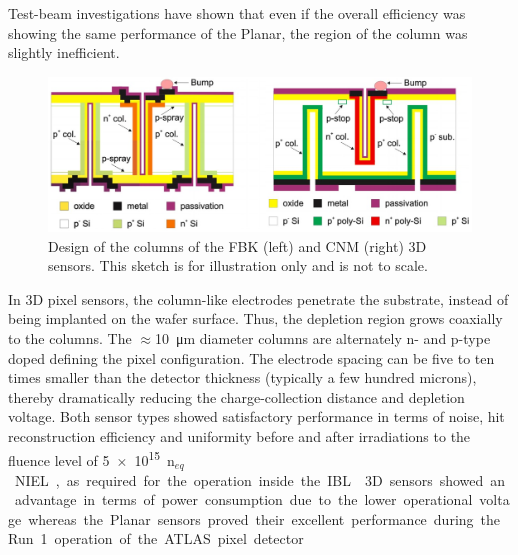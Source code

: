 Test-beam investigations have shown that even if the overall efficiency was showing the same performance of the Planar, the region of the column was slightly inefficient. \\
\begin{figure}
\centering
\includegraphics[width=\textwidth]{Images/ibl_paper/chapter04_Modules/3d_design.png}
\caption{\textbf{}Design of the columns of the FBK (left) and CNM (right) 3D sensors. This sketch is for illustration only and is not to scale.}
\label{fig:3d_design}
\end{figure}
In 3D pixel sensors, the column-like electrodes penetrate the substrate, instead of being implanted on the wafer surface. Thus, the depletion region grows coaxially to the columns. The $\approx\!$\SI{10}{\micro\meter} diameter columns are alternately n- and p-type doped defining the pixel configuration. The electrode spacing can be five to ten times smaller than the detector thickness (typically a few hundred microns), thereby dramatically reducing the charge-collection distance and depletion voltage. 
Both sensor types showed satisfactory performance in terms of noise, hit reconstruction efficiency and uniformity before and after irradiations to the fluence level of \SI{5e15}{n$_{eq}$\per\square{\centi\meter}} NIEL, as required for the operation inside the IBL~\cite{IBL_mod_proto}. 3D sensors showed an advantage in terms of power consumption due to the lower operational voltage whereas the Planar sensors proved their excellent performance during the Run~1 operation of the ATLAS pixel detector.\\ %

